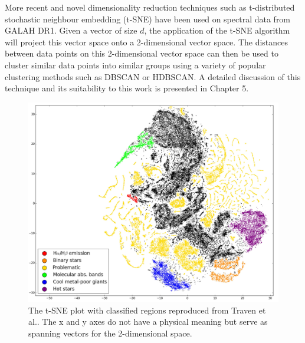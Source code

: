 More recent and novel dimensionality reduction techniques such as t-distributed stochastic neighbour embedding (t-SNE)\cite{van2008visualizing} have been used on spectral data from GALAH DR1\cite{traven2017galah}. Given a vector of size $d$, the application of the t-SNE algorithm will project this vector space onto a 2-dimensional vector space. The distances between data points on this 2-dimensional vector space can then be used to cluster similar data points into similar groups using a variety of popular clustering methods such as DBSCAN\cite{ester1996density} or HDBSCAN\cite{campello2013density}. A detailed discussion of this technique and its suitability to this work is presented in Chapter 5.

\begin{figure}[!htb]
\centering
\includegraphics[scale=0.40]{figures/tsne traven.png}
\caption{The t-SNE plot with classified regions reproduced from Traven et al.\cite{traven2017galah}. The x and y axes do not have a physical meaning but serve as spanning vectors for the 2-dimensional space.}
\end{figure}


